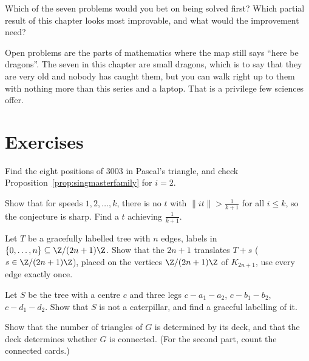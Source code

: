 \begin{think}
Which of the seven problems would you bet on being solved first? Which partial result of this chapter looks most improvable, and what would the improvement need?
\end{think}

\begin{beauty}
Open problems are the parts of mathematics where the map still says ``here be dragons''. The seven in this chapter are small dragons, which is to say that they are very old and nobody has caught them,
but you can walk right up to them with nothing more than this series and a laptop. That is a privilege few sciences offer.
\end{beauty}

\section{Exercises}

\begin{exercise}[$\star$]\label{ex:singmaster3003}
Find the eight positions of $3003$ in Pascal's triangle, and check Proposition~\ref{prop:singmasterfamily} for $i=2$.
\end{exercise}

\begin{exercise}[$\star\star$]\label{ex:lonelysharp}
Show that for speeds $1,2,\dots,k$, there is no $t$ with $\|it\|>\frac1{k+1}$ for all $i\le k$, so the conjecture is sharp. Find a $t$ achieving $\frac1{k+1}$.
\end{exercise}

\begin{exercise}[$\star$]\label{ex:ringel}
Let $T$ be a gracefully labelled tree with $n$ edges, labels in $\{0,\dots,n\}\subseteq\Z/(2n+1)\Z$. Show that the $2n+1$ translates $T+s$ ($s\in\Z/(2n+1)\Z$), placed on the vertices $\Z/(2n+1)\Z$ of $K_{2n+1}$, use every edge exactly once.
\end{exercise}

\begin{exercise}[$\star\star$]\label{ex:spider}
Let $S$ be the tree with a centre $c$ and three legs $c-a_1-a_2$, $c-b_1-b_2$, $c-d_1-d_2$. Show that $S$ is not a caterpillar, and find a graceful labelling of it.
\end{exercise}

\begin{exercise}[$\star\star$]\label{ex:kellytri}
Show that the number of triangles of $G$ is determined by its deck, and that the deck determines whether $G$ is connected. (For the second part, count the connected cards.)
\end{exercise}

